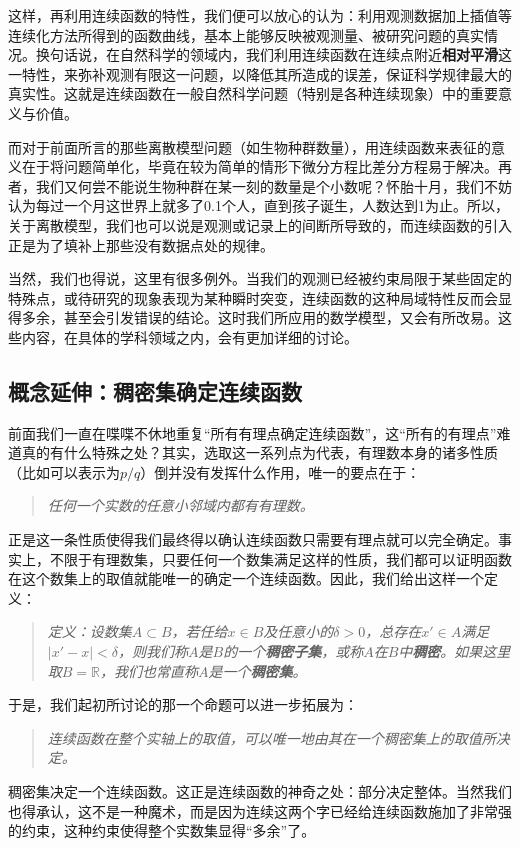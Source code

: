 \documentclass[12pt,a4paper]{article}
\begin{document}
{{			这样，再利用连续函数的特性，我们便可以放心的认为：利用观测数据加上插值等连续化方法所得到的函数曲线，基本上能够反映被观测量、被研究问题的真实情况。换句话说，在自然科学的领域内，我们利用连续函数在连续点附近{\bfseries 相对平滑}这一特性，来弥补观测有限这一问题，以降低其所造成的误差，保证科学规律最大的真实性。这就是连续函数在一般自然科学问题（特别是各种连续现象）中的重要意义与价值。
			
			而对于前面所言的那些离散模型问题（如生物种群数量），用连续函数来表征的意义在于将问题简单化，毕竟在较为简单的情形下微分方程比差分方程易于解决。再者，我们又何尝不能说生物种群在某一刻的数量是个小数呢？怀胎十月，我们不妨认为每过一个月这世界上就多了0.1个人，直到孩子诞生，人数达到1为止。所以，关于离散模型，我们也可以说是观测或记录上的间断所导致的，而连续函数的引入正是为了填补上那些没有数据点处的规律。
			
			当然，我们也得说，这里有很多例外。当我们的观测已经被约束局限于某些固定的特殊点，或待研究的现象表现为某种瞬时突变，连续函数的这种局域特性反而会显得多余，甚至会引发错误的结论。这时我们所应用的数学模型，又会有所改易。这些内容，在具体的学科领域之内，会有更加详细的讨论。
		}
	
		\subsection{概念延伸：稠密集确定连续函数}{
			前面我们一直在喋喋不休地重复“所有有理点确定连续函数”，这“所有的有理点”难道真的有什么特殊之处？其实，选取这一系列点为代表，有理数本身的诸多性质（比如可以表示为$p/q$）倒并没有发挥什么作用，唯一的要点在于：
			\begin{quote}\itshape
				任何一个实数的任意小邻域内都有有理数。
			\end{quote}
			正是这一条性质使得我们最终得以确认连续函数只需要有理点就可以完全确定。事实上，不限于有理数集，只要任何一个数集满足这样的性质，我们都可以证明函数在这个数集上的取值就能唯一的确定一个连续函数。因此，我们给出这样一个定义：
			\begin{quote}\itshape
				定义：设数集$A\subset B$，若任给$x\in B$及任意小的$\delta>0$，总存在$x'\in A$满足$\mid x'-x\mid<\delta$，则我们称$A$是$B$的一个{\bfseries 稠密子集}，或称$A$在$B$中{\bfseries 稠密}。如果这里取$B=\mathbb{R}$，我们也常直称$A$是一个{\bfseries 稠密集}。
			\end{quote}
			于是，我们起初所讨论的那一个命题可以进一步拓展为：
			\begin{quote}\itshape
				连续函数在整个实轴上的取值，可以唯一地由其在一个稠密集上的取值所决定。
			\end{quote}
			稠密集决定一个连续函数。这正是连续函数的神奇之处：部分决定整体。当然我们也得承认，这不是一种魔术，而是因为连续这两个字已经给连续函数施加了非常强的约束，这种约束使得整个实数集显得“多余”了。
			
}}
\end{document}
